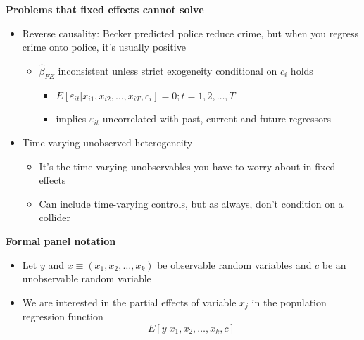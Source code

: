 \documentclass[notes=show]{beamer}
\begin{document}
\begin{frame}[plain]
	\begin{center}
	\textbf{Problems that fixed effects cannot solve}
	\end{center}
	
	\begin{itemize}
		\item Reverse causality: Becker predicted police reduce crime, but when you regress crime onto police, it's usually positive 
			\begin{itemize}
			\item $\widehat{\beta}_{FE}$ inconsistent unless strict exogeneity conditional on $c_i$ holds
				\begin{itemize}
				\item $E[\varepsilon_{it} | x_{i1},x_{i2},\dots,x_{iT},c_i]=0; t=1,2,\dots,T$
				\item implies $\varepsilon_{it}$ uncorrelated with past, current and future regressors
				\end{itemize}
			\end{itemize}
		\item Time-varying unobserved heterogeneity
			\begin{itemize}
			\item It's the time-varying unobservables you have to worry about in fixed effects
			\item Can include time-varying controls, but as always, don't condition on a collider
			\end{itemize}
	\end{itemize}
\end{frame}


\begin{frame}[plain]
	\begin{center}
	\textbf{Formal panel notation}
	\end{center}
	
	\begin{itemize}
	\item Let $y$ and $x\equiv(x_1, x_2, \dots, x_k)$ be observable random variables and $c$ be an unobservable random variable
	\item We are interested in the partial effects of variable $x_j$ in the population regression function$$E[y|x_1,x_2,\dots,x_k,c]$$
	\end{itemize}
\end{frame}
\end{document}
